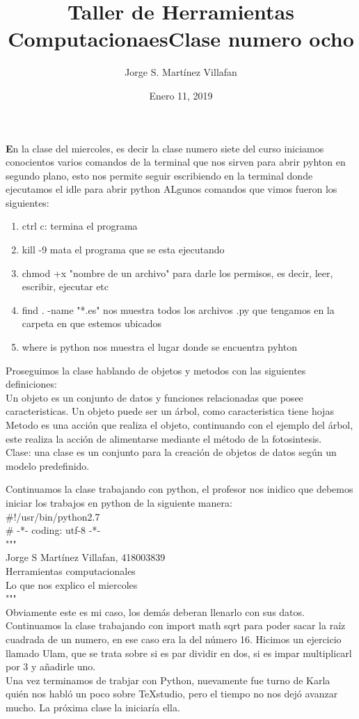 \documentclass[letterpaper, 12pt, oneside]{article}%
\title{\Huge Taller de Herramientas Computacionaes}
\author{Jorge S. Martínez Villafan}
\date{Enero 11, 2019}
\begin{document}
\maketitle
\newpage
\title{Clase numero ocho}

\textbf En la clase del miercoles, es decir la clase numero siete del curso iniciamos conocientos varios comandos de la terminal que nos sirven para abrir pyhton en segundo plano, esto nos permite seguir escribiendo en la terminal donde ejecutamos el idle para abrir python
ALgunos comandos que vimos fueron los siguientes:
\begin{enumerate}
\item ctrl c: termina el programa
\item kill -9 mata el programa que se esta ejecutando
\item chmod +x "nombre de un archivo" para darle los permisos, es decir, leer, escribir, ejecutar etc
\item find . -name "*.es" nos muestra todos los archivos .py que tengamos en la carpeta en que estemos ubicados
\item where is python nos muestra el lugar donde se encuentra pyhton
\end{enumerate}
Proseguimos la clase hablando de objetos y metodos con las siguientes definiciones:\\
Un objeto es un conjunto de datos y funciones relacionadas que posee caracteristicas. Un objeto puede ser un árbol, como caracteristica tiene hojas\\
Metodo es una acción que realiza el objeto, continuando con el ejemplo del árbol, este realiza la acción de alimentarse mediante el método de la fotosintesis. \\
Clase: una clase es un conjunto para la creación de objetos de datos según un modelo predefinido.

Continuamos la clase trabajando con python, el profesor nos inidico que debemos iniciar los trabajos en python de la siguiente manera:\\

\#!/usr/bin/python2.7\\
\# -*- coding: utf-8 -*-\\
"""\\
Jorge S Martínez Villafan, 418003839\\
Herramientas computacionales\\
Lo que nos explico el miercoles\\
"""\\
Obviamente este es mi caso, los demás deberan llenarlo con sus datos.
Continuamos la clase trabajando con import math sqrt para poder sacar la raíz cuadrada de un numero, en ese caso era la del número 16. Hicimos un ejercicio llamado Ulam, que se trata sobre si es par dividir en dos, si es impar multiplicarl por 3 y añadirle uno. \\
Una vez terminamos de trabjar con Python, nuevamente fue turno de Karla quién nos habló un poco sobre TeXstudio, pero el tiempo no nos dejó avanzar mucho. La próxima clase la iniciaría ella.
\end{document}
